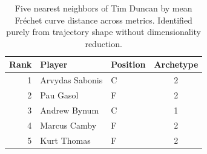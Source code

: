 \begin{table}[htbp]
  \centering\small
  \begin{tabular}{rllc}
    \toprule
    Rank & Player & Position & Archetype \\
    \midrule
    1 & Arvydas Sabonis & C & 2 \\
    2 & Pau Gasol & F & 2 \\
    3 & Andrew Bynum & C & 1 \\
    4 & Marcus Camby & F & 2 \\
    5 & Kurt Thomas & F & 2 \\
    \bottomrule
  \end{tabular}
  \caption{Five nearest neighbors of Tim Duncan by mean Fr\'{e}chet curve distance across metrics. Identified purely from trajectory shape without dimensionality reduction.}
  \label{tab:Tim_Duncan_frechet_curve_neighbors}
\end{table}


